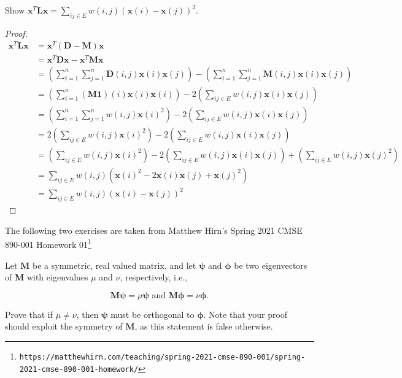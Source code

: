 \documentclass[11pt,letterpaper]{article}
\begin{document}
\begin{exercise} Show $\bm{x}^T\bm{L}\bm{x} = \sum_{ij \in E} w(i,j)(\bm{x}(i) - \bm{x}(j))^2$.
\end{exercise}

\begin{proof}
  \begin{align*}
    \bm{x}^T\bm{L}\bm{x} &= \bm{x}^T(\bm{D} - \bm{M})\bm{x}\\
    &= \bm{x}^T \bm{D}\bm{x} - \bm{x}^T \bm{M}\bm{x}\\
    &= \left(\sum_{i=1}^n \sum_{j=1}^n \bm{D}(i,j) \bm{x}(i) \bm{x}(j)\right)
    - \left(\sum_{i=1}^n \sum_{j=1}^n \bm{M}(i,j) \bm{x}(i) \bm{x}(j)\right)\\
    &= \left(\sum_{i=1}^n (\bm{M}\bm{1})(i) \bm{x}(i) \bm{x}(i)\right)
    - 2 \left(\sum_{ij \in E} w(i,j) \bm{x}(i) \bm{x}(j)\right)\\
    &= \left(\sum_{i=1}^n \sum_{j=1}^n w(i,j) \bm{x}(i)^2\right)
    - 2 \left(\sum_{ij \in E} w(i,j) \bm{x}(i) \bm{x}(j)\right)\\
    &= 2\left(\sum_{ij \in E} w(i,j) \bm{x}(i)^2\right)
    - 2 \left(\sum_{ij \in E} w(i,j) \bm{x}(i) \bm{x}(j)\right)\\
    &= \left(\sum_{ij \in E} w(i,j) \bm{x}(i)^2\right)
    - 2 \left(\sum_{ij \in E} w(i,j) \bm{x}(i) \bm{x}(j)\right)
    + \left(\sum_{ij \in E} w(i,j) \bm{x}(j)^2\right)\\
    &= \sum_{ij \in E} w(i,j) \left(\bm{x}(i)^2 - 2 \bm{x}(i) \bm{x}(j) + \bm{x}(j)^2\right)\\
    &= \sum_{ij \in E} w(i,j)(\bm{x}(i) - \bm{x}(j))^2
  \end{align*}
\end{proof}

The following two exercises are taken from Matthew Hirn's Spring 2021 CMSE 890-001 Homework 01\footnote{%
\texttt{https://matthewhirn.com/teaching/spring-2021-cmse-890-001/spring-2021-cmse-890-001-homework/}
}

\begin{exercise}
  Let $\bm{M}$ be a symmetric, real valued matrix, and let $\bm{\psi}$ and $\bm{\phi}$ be two eigenvectors of $\bm{M}$
  with eigenvalues $\mu$ and $\nu$, respectively, i.e.,

  $$\bm{M}\bm{\psi} = \mu \bm{\psi} \text{ and } \bm{M}\bm{\phi} = \nu \bm{\phi}.$$

  Prove that if $\mu \neq \nu$, then $\bm{\psi}$ must be orthogonal to $\bm{\phi}$.
  Note that your proof should exploit the symmetry of $\bm{M}$, as this statement is false otherwise.
\end{exercise}
\end{document}
